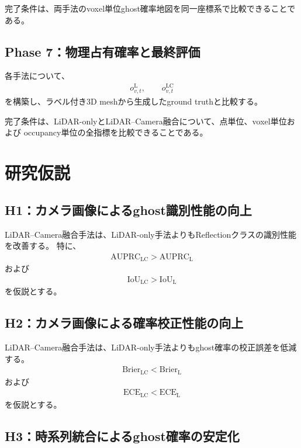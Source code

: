\documentclass[uplatex,a4paper,11pt]{jsarticle}
\begin{document}
完了条件は、両手法のvoxel単位ghost確率地図を同一座標系で比較できることである。

\subsection{Phase 7：物理占有確率と最終評価}

各手法について、
\begin{align}
  o_{v,t}^{\mathrm{L}},
  \qquad
  o_{v,t}^{\mathrm{LC}}
\end{align}
を構築し、ラベル付き3D meshから生成したground truthと比較する。

完了条件は、LiDAR-onlyとLiDAR--Camera融合について、点単位、voxel単位および
occupancy単位の全指標を比較できることである。

\section{研究仮説}

\subsection{H1：カメラ画像によるghost識別性能の向上}

LiDAR--Camera融合手法は、LiDAR-only手法よりもReflectionクラスの識別性能を改善する。
特に、
\begin{align}
  \mathrm{AUPRC}_{\mathrm{LC}}
  >
  \mathrm{AUPRC}_{\mathrm{L}}
\end{align}
および
\begin{align}
  \mathrm{IoU}_{\mathrm{LC}}
  >
  \mathrm{IoU}_{\mathrm{L}}
\end{align}
を仮説とする。

\subsection{H2：カメラ画像による確率校正性能の向上}

LiDAR--Camera融合手法は、LiDAR-only手法よりもghost確率の校正誤差を低減する。
\begin{align}
  \mathrm{Brier}_{\mathrm{LC}}
  <
  \mathrm{Brier}_{\mathrm{L}}
\end{align}
および
\begin{align}
  \mathrm{ECE}_{\mathrm{LC}}
  <
  \mathrm{ECE}_{\mathrm{L}}
\end{align}
を仮説とする。

\subsection{H3：時系列統合によるghost確率の安定化}
\end{document}
